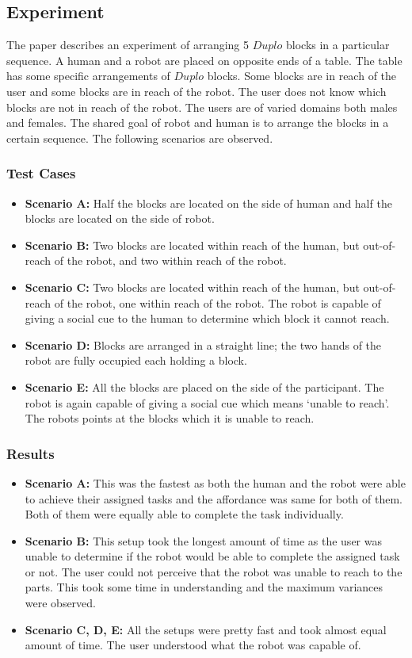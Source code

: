 \documentclass[letterpaper,12pt]{article}
\begin{document}
\subsection{Experiment}
The paper describes an experiment of arranging 5 $Duplo$ blocks in a particular sequence. A human and a robot are placed on opposite ends of a table. The table has some specific arrangements of $Duplo$ blocks. Some blocks are in reach of the user and some blocks are in reach of the robot. The user does not know which blocks are not in reach of the robot. The users are of varied domains both males and females. The shared goal of robot and human is to arrange the blocks in a certain sequence. The following scenarios are observed.

\small
\subsubsection{Test Cases}
\begin{itemize}
\item \textbf{Scenario A:} Half the blocks are located on the side of human and half the blocks are located on the side of robot.
\item \textbf{Scenario B:} Two blocks are located within reach of the human, but out-of-reach of the robot, and two within reach of the robot.
\item \textbf{Scenario C:} Two blocks are located within reach of the human, but out-of-reach of the robot, one within reach of the robot. The robot is capable of giving a social cue to the human to determine which block it cannot reach.
\item \textbf{Scenario D:} Blocks are arranged in a straight line; the two hands of the robot are fully occupied each holding a block.
\item \textbf{Scenario E:} All the blocks are placed on the side of the participant. The robot is again capable of giving a social cue which means `unable to reach'. The robots points at the blocks which it is unable to reach.
\end{itemize}

\subsubsection{Results}
\begin{itemize}
\item \textbf{Scenario A:} This was the fastest as both the human and the robot were able to achieve their assigned tasks and the affordance was same for both of them. Both of them were equally able to complete the task individually.
\item \textbf{Scenario B:} This setup took the longest amount of time as the user was unable to determine if the robot would be able to complete the assigned task or not. The user could not perceive that the robot was unable to reach to the parts. This took some time in understanding and the maximum variances were observed.
\item \textbf{Scenario C, D, E:} All the setups were pretty fast and took almost equal amount of time. The user understood what the robot was capable of.
\end{itemize}
\end{document}
